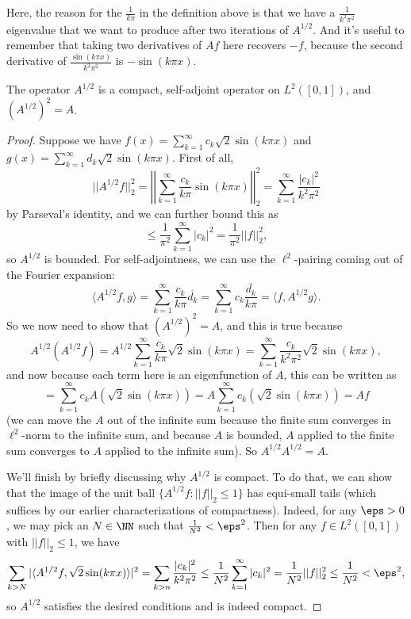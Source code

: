 Here, the reason for the $\frac{1}{k\pi}$ in the definition above is that we have a $\frac{1}{k^2\pi^2}$ eigenvalue that we want to produce after two iterations of $A^{1/2}$. And it's useful to remember that taking two derivatives of $Af$ here recovers $-f$, because the second derivative of $\frac{\sin (k \pi x)}{k^2\pi^2}$ is $-\sin(k \pi x)$. 

\begin{theorem}
The operator $A^{1/2}$ is a compact, self-adjoint operator on $L^2([0, 1])$, and $(A^{1/2})^2 = A$.
\end{theorem}
\begin{proof}
Suppose we have $f(x) = \sum_{k=1}^{\infty} c_k \sqrt{2} \sin(k \pi x)$ and $g(x) = \sum_{k=1}^{\infty} d_k \sqrt{2} \sin (k \pi x)$. First of all, 
\[
    ||A^{1/2} f||_2^2 = \left|\left|\sum_{k=1}^{\infty} \frac{c_k}{k\pi} \sin(k \pi x)\right|\right|_2^2 = \sum_{k=1}^{\infty} \frac{|c_k|^2}{k^2\pi^2}
\]
by Parseval's identity, and we can further bound this as
\[
    \le \frac{1}{\pi^2} \sum_{k=1}^{\infty} |c_k|^2 = \frac{1}{\pi^2} ||f||_2^2,
\]
so $A^{1/2}$ is bounded. For self-adjointness, we can use the $\ell^2$-pairing coming out of the Fourier expansion:
\[
    \langle A^{1/2} f, g \rangle = \sum_{k=1}^{\infty}\frac{c_k}{k\pi} \overline{d_k} = \sum_{k=1}^{\infty} c_k \overline{\frac{d_k}{k\pi}} = \langle f, A^{1/2} g \rangle.
\]
So we now need to show that $(A^{1/2})^2 = A$, and this is true because 
\[
    A^{1/2}(A^{1/2} f) = A^{1/2} \sum_{k=1}^{\infty} \frac{c_k}{k\pi} \sqrt{2} \sin(k \pi x) = \sum_{k=1}^{\infty} \frac{c_k}{k^2\pi^2} \sqrt{2} \sin(k \pi x),
\]  
and now because each term here is an eigenfunction of $A$, this can be written as 
\[
    = \sum_{k=1}^{\infty} c_k A (\sqrt{2} \sin(k \pi x)) = A\sum_{k=1}^{\infty} c_k (\sqrt{2} \sin(k \pi x)) = Af
\]
(we can move the $A$ out of the infinite sum because the finite sum converges in $\ell^2$-norm to the infinite sum, and because $A$ is bounded, $A$ applied to the finite sum converges to $A$ applied to the infinite sum). So $A^{1/2}A^{1/2} = A$.

We'll finish by briefly discussing why $A^{1/2}$ is compact. To do that, we can show that the image of the unit ball $\{A^{1/2}f: ||f||_2 \le 1\}$ has equi-small tails (which suffices by our earlier characterizations of compactness). Indeed, for any $\eps > 0$, we may pick an $N \in \NN$ such that $\frac{1}{N^2} < \eps^2$. Then for any $f \in L^2([0, 1])$ with $||f||_2 \le 1$, we have
\[
    \sum_{k>N} |\langle A^{1/2} f, \sqrt{2} \sin(k \pi x) \rangle|^2 = \sum_{k>n} \frac{|c_k|^2}{k^2\pi^2} \le \frac{1}{N^2} \sum_{k=1}^{\infty} |c_k|^2 = \frac{1}{N^2}||f||_2^2 \le \frac{1}{N^2} < \eps^2,
\]
so $A^{1/2}$ satisfies the desired conditions and is indeed compact. 
\end{proof}

